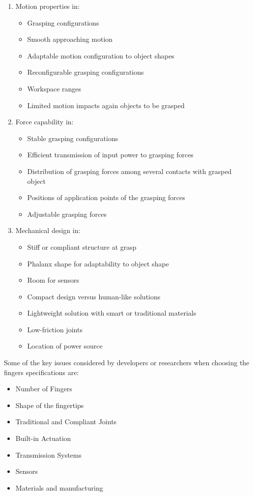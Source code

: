 \documentclass[a4paper, 10pt, conference]{ieeeconf}      %
\begin{document}
\begin{enumerate}
  \item Motion properties in:
  	\begin{itemize}
  		\item Grasping configurations
  		\item Smooth approaching motion
		\item Adaptable motion configuration to object shapes
		\item Reconfigurable grasping configurations
		\item Workspace ranges
		\item Limited motion impacts again objects to be grasped
	\end{itemize}
  \item Force capability in:
  	\begin{itemize}
  		\item Stable grasping configurations
		\item Efficient transmission of input power to grasping forces
		\item Distribution of grasping forces among several contacts with grasped object
		\item Positions of application points of the grasping forces
		\item Adjustable grasping forces
  	\end{itemize}
  \item Mechanical design in:
  	\begin{itemize}
  		\item Stiff or compliant structure at grasp
		\item Phalanx shape for adaptability to object shape
		\item Room for sensors
		\item Compact design versus human-like solutions
		\item Lightweight solution with smart or traditional materials
		\item Low-friction joints
		\item Location of power source\\
  	\end{itemize}
\end{enumerate}
Some of the key issues considered by developers or researchers when choosing the fingers specifications are:\\
	\begin{itemize}
		\item Number of Fingers
		\item Shape of the fingertips
		\item Traditional and Compliant Joints
		\item Built-in Actuation
		\item Transmission Systems
		\item Sensors
		\item Materials and manufacturing\\
	\end{itemize}
\end{document}
